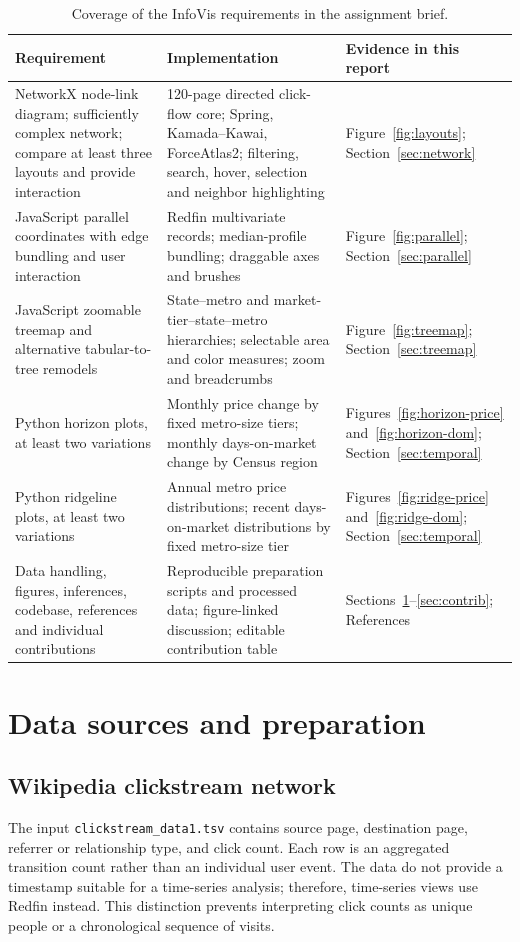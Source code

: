 \documentclass[11pt,letterpaper]{article}
\begin{document}
\begin{table}[H]
\centering\small
\begin{tabularx}{\textwidth}{p{}YY}
\toprule
\textbf{Requirement} & \textbf{Implementation} & \textbf{Evidence in this report} \\
\midrule
NetworkX node-link diagram; sufficiently complex network; compare at least three layouts and provide interaction & 120-page directed click-flow core; Spring, Kamada--Kawai, ForceAtlas2; filtering, search, hover, selection and neighbor highlighting & Figure~\ref{fig:layouts}; Section~\ref{sec:network} \\
JavaScript parallel coordinates with edge bundling and user interaction & Redfin multivariate records; median-profile bundling; draggable axes and brushes & Figure~\ref{fig:parallel}; Section~\ref{sec:parallel} \\
JavaScript zoomable treemap and alternative tabular-to-tree remodels & State--metro and market-tier--state--metro hierarchies; selectable area and color measures; zoom and breadcrumbs & Figure~\ref{fig:treemap}; Section~\ref{sec:treemap} \\
Python horizon plots, at least two variations & Monthly price change by fixed metro-size tiers; monthly days-on-market change by Census region & Figures~\ref{fig:horizon-price} and~\ref{fig:horizon-dom}; Section~\ref{sec:temporal} \\
Python ridgeline plots, at least two variations & Annual metro price distributions; recent days-on-market distributions by fixed metro-size tier & Figures~\ref{fig:ridge-price} and~\ref{fig:ridge-dom}; Section~\ref{sec:temporal} \\
Data handling, figures, inferences, codebase, references and individual contributions & Reproducible preparation scripts and processed data; figure-linked discussion; editable contribution table & Sections~\ref{sec:data}--\ref{sec:contrib}; References \\
\bottomrule
\end{tabularx}
\caption{Coverage of the InfoVis requirements in the assignment brief.}
\label{tab:coverage}
\end{table}

\section{Data sources and preparation}\label{sec:data}
\subsection{Wikipedia clickstream network}
The input \texttt{clickstream\_data1.tsv} contains source page, destination page, referrer or relationship type, and click count. Each row is an aggregated transition count rather than an individual user event. The data do not provide a timestamp suitable for a time-series analysis; therefore, time-series views use Redfin instead. This distinction prevents interpreting click counts as unique people or a chronological sequence of visits.
\end{document}
